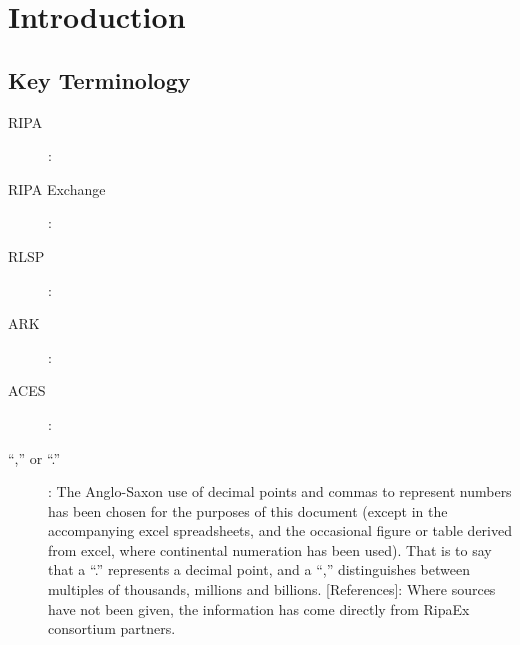 \documentclass[11pt,fleqn]{book} %
\begin{document}



\chapter{Introduction}

\lipsum[1-3] %




\section{Key Terminology}
\begin{description}
	\item[RIPA]: \lipsum[1]
    \item[RIPA Exchange]: \lipsum[2]
    \item[RLSP]: \lipsum[3]
	\item[ARK]: \lipsum[4]
    \item[ACES]: \lipsum[5]
    \item[“,” or “.”]: The Anglo-Saxon use of decimal points and commas to represent numbers has
been chosen for the purposes of this document (except in the accompanying excel
spreadsheets, and the occasional figure or table derived from excel, where continental
numeration has been used). That is to say that a “.” represents a decimal point, and a “,”
distinguishes between multiples of thousands, millions and billions.
[References]: Where sources have not been given, the information has come directly from
RipaEx consortium partners.
    \end{description}

\end{document}
